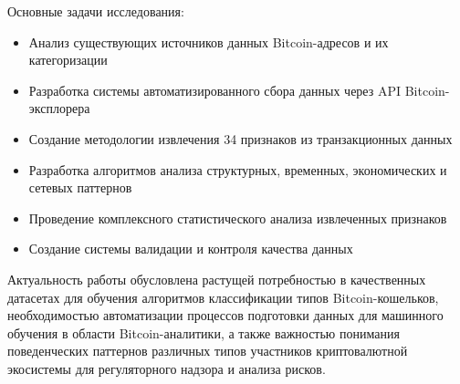 Основные задачи исследования:
\begin{itemize}
    \item Анализ существующих источников данных Bitcoin-адресов и их категоризации
    \item Разработка системы автоматизированного сбора данных через API Bitcoin-эксплорера
    \item Создание методологии извлечения 34 признаков из транзакционных данных
    \item Разработка алгоритмов анализа структурных, временных, экономических и сетевых паттернов
    \item Проведение комплексного статистического анализа извлеченных признаков
    \item Создание системы валидации и контроля качества данных
\end{itemize}

Актуальность работы обусловлена растущей потребностью в качественных датасетах для обучения алгоритмов классификации типов Bitcoin-кошельков, необходимостью автоматизации процессов подготовки данных для машинного обучения в области Bitcoin-аналитики, а также важностью понимания поведенческих паттернов различных типов участников криптовалютной экосистемы для регуляторного надзора и анализа рисков.